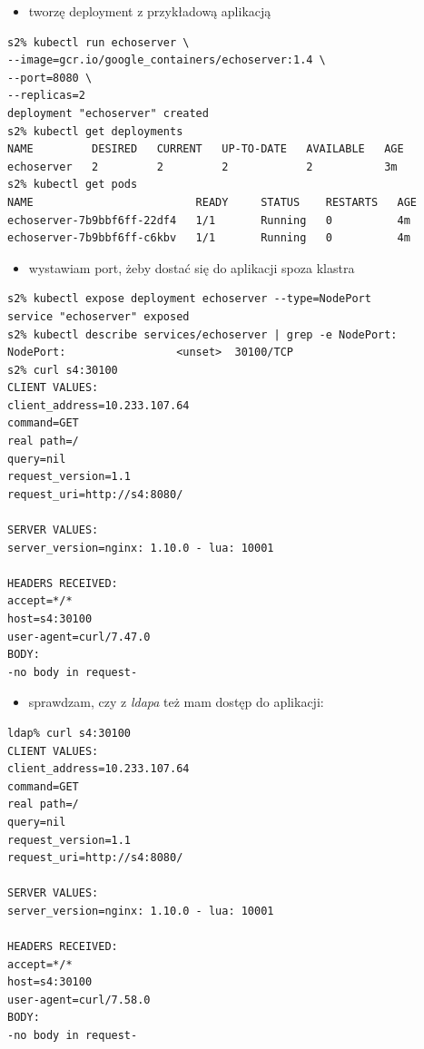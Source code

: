 \documentclass[a4paper,12pt,twoside,openany]{report}
\providecommand{\tightlist}{%
  \setlength{\itemsep}{0pt}\setlength{\parskip}{0pt}}
\begin{document}
\begin{itemize}
\tightlist
\item
  tworzę deployment z przykładową aplikacją
\end{itemize}

\begin{lstlisting}
s2% kubectl run echoserver \                                                                                                    
--image=gcr.io/google_containers/echoserver:1.4 \
--port=8080 \
--replicas=2
deployment "echoserver" created
s2% kubectl get deployments
NAME         DESIRED   CURRENT   UP-TO-DATE   AVAILABLE   AGE
echoserver   2         2         2            2           3m
s2% kubectl get pods
NAME                         READY     STATUS    RESTARTS   AGE
echoserver-7b9bbf6ff-22df4   1/1       Running   0          4m
echoserver-7b9bbf6ff-c6kbv   1/1       Running   0          4m
\end{lstlisting}

\begin{itemize}
\tightlist
\item
  wystawiam port, żeby dostać się do aplikacji spoza klastra
\end{itemize}

\begin{lstlisting}
s2% kubectl expose deployment echoserver --type=NodePort
service "echoserver" exposed
s2% kubectl describe services/echoserver | grep -e NodePort:
NodePort:                 <unset>  30100/TCP
s2% curl s4:30100
CLIENT VALUES:
client_address=10.233.107.64
command=GET
real path=/
query=nil
request_version=1.1
request_uri=http://s4:8080/

SERVER VALUES:
server_version=nginx: 1.10.0 - lua: 10001

HEADERS RECEIVED:
accept=*/*
host=s4:30100
user-agent=curl/7.47.0
BODY:
-no body in request-
\end{lstlisting}

\begin{itemize}
\tightlist
\item
  sprawdzam, czy z \emph{ldapa} też mam dostęp do aplikacji:
\end{itemize}

\begin{lstlisting}
ldap% curl s4:30100
CLIENT VALUES:
client_address=10.233.107.64
command=GET
real path=/
query=nil
request_version=1.1
request_uri=http://s4:8080/

SERVER VALUES:
server_version=nginx: 1.10.0 - lua: 10001

HEADERS RECEIVED:
accept=*/*
host=s4:30100
user-agent=curl/7.58.0
BODY:
-no body in request-
\end{lstlisting}
\end{document}
